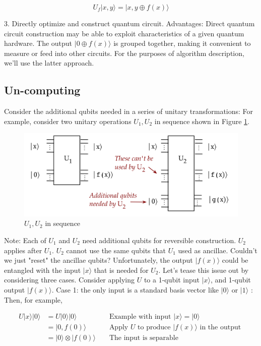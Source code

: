 \documentclass[main.tex]{subfiles}
\begin{document}
    $$
    U_{f}|x, y\rangle=|x, y \oplus f(x)\rangle
    $$
    
    3. Directly optimize and construct quantum circuit. Advantages: Direct quantum circuit construction may be able to exploit characteristics of a given quantum hardware. The output $|0 \oplus f(x)\rangle$ is grouped together, making it convenient to measure or feed into other circuits. For the purposes of algorithm description, we'll use the latter approach.

\subsection{Un-computing}

    Consider the additional qubits needed in a series of unitary transformations: For example, consider two unitary operations $U_{1}, U_{2}$ in sequence shown in Figure \ref{fig:39uncompute}.
    
    \begin{figure}
        \centering
        \includegraphics[width=5in]{notes/figs/n10/39uncompute.png}
        \caption{$U_{1}, U_{2}$ in sequence}
        \label{fig:39uncompute}
    \end{figure}
    
    Note: Each of $U_{1}$ and $U_{2}$ need additional qubits for reversible construction. $U_{2}$ applies after $U_{1}$. $U_{2}$ cannot use the same qubits that $U_{1}$ used as ancillae. Couldn't we just "reset" the ancillae qubits? Unfortunately, the output $|f(x)\rangle$ could be entangled with the input $|x\rangle$ that is needed for $U_{2}$. Let's tease this issue out by considering three cases. Consider applying $U$ to a 1-qubit input $|x\rangle$, and 1-qubit output $|f(x)\rangle$. Case 1: the only input is a standard basis vector like $|0\rangle$ or $|1\rangle$ : Then, for example,
    
    $$
    \begin{aligned}
    U|x\rangle|0\rangle &=U|0\rangle|0\rangle & & \text { Example with input }|x\rangle=|0\rangle \\
    &=|0, f(0)\rangle & & \text { Apply } U \text { to produce }|f(x)\rangle \text { in the output } \\
    &=|0\rangle \otimes|f(0)\rangle & & \text { The input is separable }
    \end{aligned}
    $$
    
\end{document}
